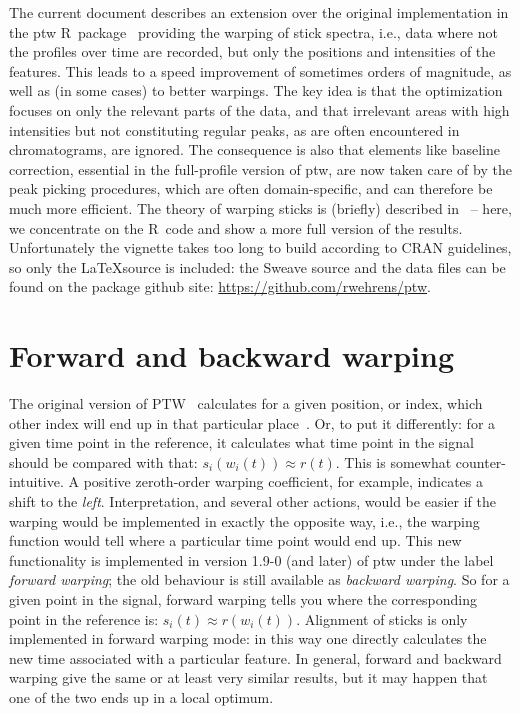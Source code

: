 \documentclass[a4paper,11pt]{article}\usepackage[]{graphicx}\usepackage[]{color}
\newcommand{\pkg}[1]{{\normalfont\fontseries{b}\selectfont #1}}
\newcommand{\proglang}[1]{{\sffamily #1}}
\newcommand{\code}[1]{{\ttfamily #1}}
\newcommand{\R}{\proglang{R}}
\begin{document}
The current document describes an extension over the original
implementation in the \pkg{ptw} \R\ package~\citep{Bloemberg2010}
providing the warping of stick spectra, i.e., data where not the 
profiles over time are recorded, but only the positions and intensities
of the features. This leads to a speed improvement of
sometimes orders of magnitude, as well as (in some cases) to better
warpings. The key idea is that the optimization focuses on only the
relevant parts of the data, and that irrelevant areas with high
intensities but not constituting regular peaks, as are often
encountered in chromatograms, are ignored. The
consequence is also that elements like baseline correction, essential
in the full-profile version of \code{ptw}, are now taken care of by
the peak picking procedures, which are often domain-specific, and can
therefore be much more efficient. The theory of warping sticks is
(briefly) described in~\citet{Wehrens2015a} -- here, we concentrate on
the \R\ code and show a more full version of the
results. Unfortunately the vignette takes too long to build according
to CRAN guidelines, so only the \LaTeX source is included: the Sweave
source and the data files can be found on the package github site:
\url{https://github.com/rwehrens/ptw}.

\section{Forward and backward warping}
The original version of PTW~\citep{Eilers2004} calculates for a given
position, or index, which other index will end up in that particular
place~\citep{Bloemberg2013}. Or, to put it differently: for a given
time point in the reference, it calculates what time point in
the signal should be compared with that: $s_i(w_i(t)) \approx r(t)$.
This is somewhat counter-intuitive. A positive zeroth-order warping
coefficient, for example, indicates a shift to the
\emph{left}. Interpretation, and several other actions, would be
easier if the warping would be implemented in exactly the opposite
way, i.e., the warping function would tell where a particular time
point would end up. This new functionality is implemented in version
1.9-0 (and later) of \pkg{ptw} under the label \emph{forward warping};
the old behaviour is still available as \emph{backward warping}. So
for a given point in the signal, forward warping tells you where the
corresponding point in the reference is: 
$s_i(t) \approx r(w_i(t))$.
Alignment of sticks is only implemented in forward warping mode: in
this way one directly calculates the new time associated with a
particular feature. In general, forward and backward warping give the
same or at least very similar results, but it may happen that one of
the two ends up in a local optimum.
\end{document}
